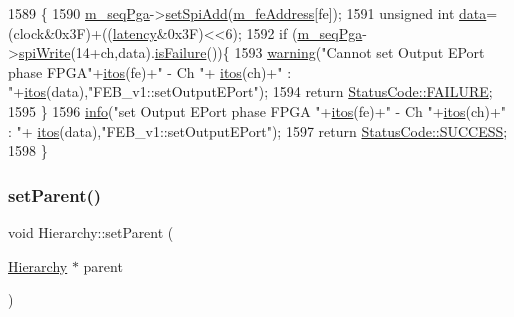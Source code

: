 \begin{DoxyCode}
1589                                                                        \{
1590   \hyperlink{classFEB__v1_a6c7804ac86796f233a8393043adf2e77}{m\_seqPga}->\hyperlink{classSeqPGA_ac998ce3a6d9b5f2e88cc8393f8c1df53}{setSpiAdd}(\hyperlink{classFEB__v1_a4e1945c2d5b434125f375e9d0fc6d99f}{m\_feAddress}[fe]);
1591   \textcolor{keywordtype}{unsigned} \textcolor{keywordtype}{int} \hyperlink{classFEB__v1_a6bca4320bd3bbbc32efc81097f33421a}{data}=(clock&0x3F)+((\hyperlink{classFEB__v1_a68050d232efd8d6568910b09a2c18f62}{latency}&0x3F)<<6);
1592   \textcolor{keywordflow}{if} (\hyperlink{classFEB__v1_a6c7804ac86796f233a8393043adf2e77}{m\_seqPga}->\hyperlink{classSeqPGA_ad4421841ce4ce8b88ad13f63216f0743}{spiWrite}(14+ch,data).\hyperlink{classStatusCode_a5dd22dc6eb2c52fc4cabc58f6dea2eb7}{isFailure}())\{
1593     \hyperlink{classObject_a65cd4fda577711660821fd2cd5a3b4c9}{warning}(\textcolor{stringliteral}{"Cannot set Output EPort phase FPGA"}+\hyperlink{Tools_8h_af330027dbdafb9a30768b3613c553e60}{itos}(fe)+\textcolor{stringliteral}{" - Ch "}+
      \hyperlink{Tools_8h_af330027dbdafb9a30768b3613c553e60}{itos}(ch)+\textcolor{stringliteral}{" : "}+\hyperlink{Tools_8h_af330027dbdafb9a30768b3613c553e60}{itos}(data),\textcolor{stringliteral}{"FEB\_v1::setOutputEPort"});
1594     \textcolor{keywordflow}{return} \hyperlink{classStatusCode_a6f565cbeadc76d14c72f047e5e85eb4ba3da73d4c469762eb9d3c960368252b26}{StatusCode::FAILURE};
1595   \}
1596   \hyperlink{classObject_a644fd329ea4cb85f54fa6846484b84a8}{info}(\textcolor{stringliteral}{"set Output EPort phase FPGA "}+\hyperlink{Tools_8h_af330027dbdafb9a30768b3613c553e60}{itos}(fe)+\textcolor{stringliteral}{" - Ch "}+\hyperlink{Tools_8h_af330027dbdafb9a30768b3613c553e60}{itos}(ch)+\textcolor{stringliteral}{" : "}+
      \hyperlink{Tools_8h_af330027dbdafb9a30768b3613c553e60}{itos}(data),\textcolor{stringliteral}{"FEB\_v1::setOutputEPort"});
1597   \textcolor{keywordflow}{return} \hyperlink{classStatusCode_a6f565cbeadc76d14c72f047e5e85eb4badd0da38d3ba0d922efd1f4619bc37ad8}{StatusCode::SUCCESS};
1598 \}
\end{DoxyCode}
\mbox{\label{classHierarchy_a585ad1aeec16077a0e532ab8b4fc557b}} 
\subsubsection{\texorpdfstring{set\+Parent()}{setParent()}}
{\footnotesize\ttfamily void Hierarchy\+::set\+Parent (\begin{DoxyParamCaption}\item[{\hyperlink{classHierarchy}{Hierarchy} $\ast$}]{parent }\end{DoxyParamCaption})\hspace{0.3cm}{\ttfamily [inherited]}}



